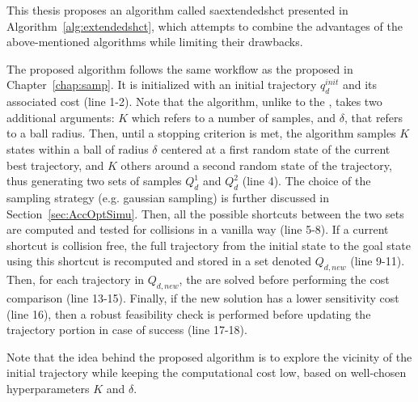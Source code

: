 This thesis proposes an algorithm called \gls{saextendedshct} presented in Algorithm~\ref{alg:extendedshct}, which attempts to combine the advantages of the above-mentioned algorithms while limiting their drawbacks.

The proposed algorithm follows the same workflow as the  proposed in Chapter~\ref{chap:samp}.
It is initialized with an initial trajectory $q_d^{init}$ and its associated cost (line 1-2).
Note that the algorithm, unlike to the , takes two additional arguments: $K$ which refers to a number of samples, and $\delta$, that refers to a ball radius.
Then, until a stopping criterion is met, the algorithm samples $K$ states within a ball of radius $\delta$ centered at a first random state of the current best trajectory, and $K$ others around a second random state of the trajectory, thus generating two sets of samples $Q_d^{1}$ and $Q_d^{2}$ (line 4).
The choice of the sampling strategy (e.g. gaussian sampling) is further discussed in Section~\ref{sec:AccOptSimu}.
Then, all the possible shortcuts between the two sets are computed and tested for collisions in a vanilla way (line 5-8).
If a current shortcut is collision free, the full trajectory from the initial state to the goal state using this shortcut is recomputed and stored in a set denoted $Q_{d,new}$ (line 9-11).
Then, for each trajectory in $Q_{d,new}$, the  are solved before performing the cost comparison (line 13-15).
Finally, if the new solution has a lower sensitivity cost (line 16), then a robust feasibility check is performed before updating the trajectory portion in case of success (line 17-18).

Note that the idea behind the proposed algorithm is to explore the vicinity of the initial trajectory while keeping the computational cost low, based on well-chosen hyperparameters $K$ and $\delta$.

